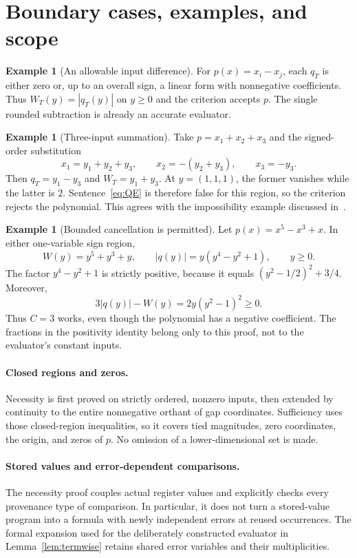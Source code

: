 \documentclass[11pt,a4paper]{article}
\numberwithin{equation}{section}
\theoremstyle{definition}
\newtheorem{example}[theorem]{Example}
\theoremstyle{remark}
\newcommand{\abs}[1]{\left|#1\right|}
\begin{document}
\section{Boundary cases, examples, and scope}\label{sec:scope}

\begin{example}[An allowable input difference]
For $p(x)=x_i-x_j$, each $q_T$ is either zero or, up to an overall sign,
a linear form with nonnegative coefficients.  Thus
$W_T(y)=\abs{q_T(y)}$ on $y\ge0$ and the criterion accepts $p$.
The single rounded subtraction is already an accurate evaluator.
\end{example}

\begin{example}[Three-input summation]
Take $p=x_1+x_2+x_3$ and the signed-order substitution
\[
 x_1=y_1+y_2+y_3,\qquad
 x_2=-(y_2+y_3),\qquad x_3=-y_3.
\]
Then $q_T=y_1-y_3$ and $W_T=y_1+y_3$.  At $y=(1,1,1)$, the former
vanishes while the latter is $2$.  Sentence~\eqref{eq:QE} is therefore
false for this region, so the criterion rejects the polynomial.  This
agrees with the impossibility example discussed in~\cite{DDH06,DDHK08}.
\end{example}

\begin{example}[Bounded cancellation is permitted]
Let $p(x)=x^5-x^3+x$.  In either one-variable sign region,
\[
 W(y)=y^5+y^3+y,\qquad
 \abs{q(y)}=y(y^4-y^2+1),\qquad y\ge0.
\]
The factor $y^4-y^2+1$ is strictly positive, because it equals
$(y^2-1/2)^2+3/4$.  Moreover,
\[
 3\abs{q(y)}-W(y)=2y(y^2-1)^2\ge0.
\]
Thus $C=3$ works, even though the polynomial has a negative coefficient.
The fractions in the positivity identity belong only to this proof, not
to the evaluator's constant inputs.
\end{example}

\paragraph{Closed regions and zeros.}
Necessity is first proved on strictly ordered, nonzero inputs, then
extended by continuity to the entire nonnegative orthant of gap
coordinates.  Sufficiency uses those closed-region inequalities, so it
covers tied magnitudes, zero coordinates, the origin, and zeros of $p$.
No omission of a lower-dimensional set is made.

\paragraph{Stored values and error-dependent comparisons.}
The necessity proof couples actual register values and explicitly checks
every provenance type of comparison.  In particular, it does not turn a
stored-value program into a formula with newly independent errors at
reused occurrences.  The formal expansion used for the deliberately
constructed evaluator in Lemma~\ref{lem:termwise} retains shared error
variables and their multiplicities.
\end{document}
